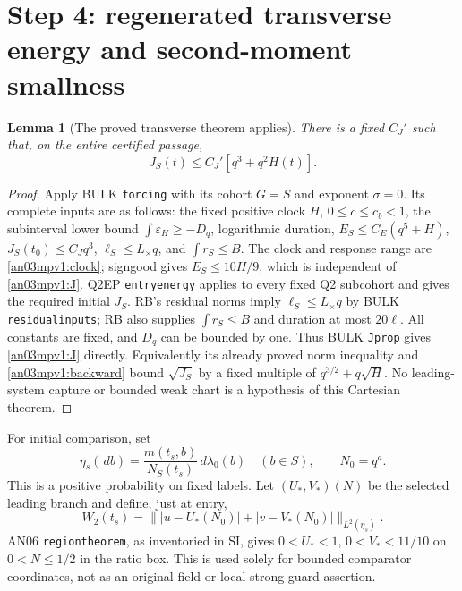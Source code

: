 \documentclass[11pt]{article}
\numberwithin{equation}{section}
\newtheorem{lemma}[theorem]{Lemma}\newtheorem{proposition}[theorem]{Proposition}
\theoremstyle{remark}\newtheorem{remark}[theorem]{Remark}
\newcommand{\dd}{\,d}\newcommand{\E}{\mathbb E}
\newcommand{\eps}{\varepsilon}\newcommand{\one}{\mathbf1}
\begin{document}
\section{Step 4: regenerated transverse energy and second-moment smallness}
\begin{lemma}[The proved transverse theorem applies]
\label{an03mpv1:transverse}
There is a fixed $C_J'$ such that, on the entire certified passage,
\begin{equation}
 J_S(t)\le C_J'[q^3+q^2H(t)].
 \label{an03mpv1:J}
\end{equation}
\end{lemma}
\begin{proof}
Apply BULK \texttt{forcing} with its cohort $G=S$ and exponent
$\sigma=0$. Its complete inputs are as follows:
the fixed positive clock $H$, $0\le c\le c_b<1$, the subinterval
lower bound $\int\eps_H\ge-D_q$, logarithmic duration,
$E_S\le C_E(q^5+H)$, $J_S(t_0)\le C_Jq^3$,
$\ell_S\le L_\times q$, and $\int r_S\le B$.
The clock and response range are \eqref{an03mpv1:clock};
signgood gives $E_S\le10H/9$, which is independent of
\eqref{an03mpv1:J}. Q2EP \texttt{entryenergy} applies to every
fixed Q2 subcohort and gives the required initial $J_S$.
RB's residual norms imply $\ell_S\le L_\times q$ by BULK
\texttt{residualinputs}; RB also supplies $\int r_S\le B$
and duration at most $20\ell$. All constants are fixed, and
$D_q$ can be bounded by one.
Thus BULK \texttt{Jprop} gives \eqref{an03mpv1:J} directly.
Equivalently its already proved norm inequality and
\eqref{an03mpv1:backward} bound $\sqrt{J_S}$ by a fixed multiple
of $q^{3/2}+q\sqrt H$. No leading-system capture or bounded
weak chart is a hypothesis of this Cartesian theorem.
\end{proof}

For initial comparison, set
\[
 \eta_s(\dd b)=\frac{m(t_s,b)}{N_S(t_s)}\dd\lambda_0(b)
 \quad(b\in S),\qquad N_0=q^a.
\]
This is a positive probability on fixed labels. Let
$(U_*,V_*)(N)$ be the selected leading branch and define, just at
entry,
\begin{equation}
 W_2(t_s)=\big\||u-U_*(N_0)|+|v-V_*(N_0)|\big\|_{L^2(\eta_s)}.
 \label{an03mpv1:Wp}
\end{equation}
AN06 \texttt{regiontheorem}, as inventoried in SI, gives
$0<U_*<1$, $0<V_*<11/10$ on $0<N\le1/2$ in the ratio box.
This is used solely for bounded comparator coordinates, not as
an original-field or local-strong-guard assertion.
\end{document}
